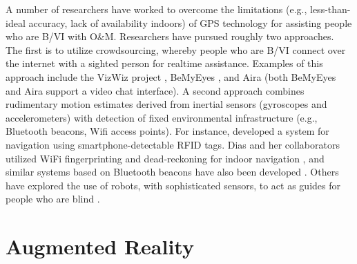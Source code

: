 \documentclass[chi_draft]{sigchi}
\newcommand{\BVI}{B/VI\xspace}
\newcommand{\OM}{O\&M\xspace}
\begin{document}
A number of researchers have worked to overcome the limitations (e.g., less-than-ideal accuracy, lack of availability indoors) of GPS technology for assisting people who are \BVI with \OM.  Researchers have pursued roughly two approaches.  The first is to utilize crowdsourcing, whereby people who are \BVI connect over the internet with a sighted person for realtime assistance.  Examples of this approach include the VizWiz project \cite{bigham2010vizwiz}, BeMyEyes \cite{bemyeyesaccessworld}, and Aira \cite{aira} (both BeMyEyes and Aira support a video chat interface).  A second approach combines rudimentary motion estimates derived from inertial sensors (gyroscopes and accelerometers) with detection of fixed environmental infrastructure (e.g., Bluetooth beacons, Wifi access points).  For instance, \cite{ganz2015percept, ganz2011percept, ganz2014percept} developed a system for navigation using smartphone-detectable RFID tags.  Dias and her collaborators utilized WiFi fingerprinting and dead-reckoning for indoor navigation \cite{Dias__2014_7778}, and similar systems based on Bluetooth beacons have also been developed \cite{ishihara2017beacon, ahmetovic2016navcog}.  Others have explored the use of robots, with sophisticated sensors, to act as guides for people who are blind \cite{Nanavati:2018:CIN:3173386.3176976}.


\section{Augmented Reality}
%
\end{document}
